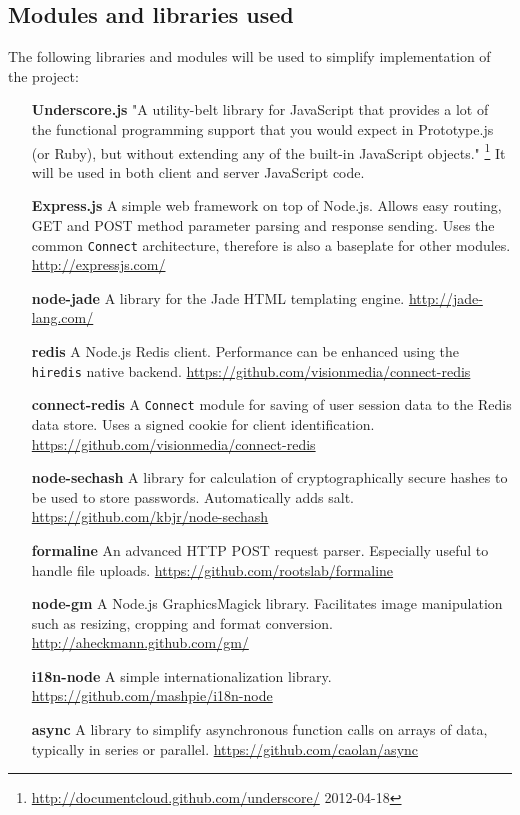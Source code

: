 \documentclass[12pt,oneside]{fithesis}
\begin{document}
	\subsection{Modules and libraries used}
		The following libraries and modules will be used to simplify implementation of the project:
		\begin{itemize}
			\item[\textbf{Underscore.js}] "A utility-belt library for JavaScript that provides a lot of the functional programming support that you would expect in Prototype.js (or Ruby), but without extending any of the built-in JavaScript objects." \footnote{\url{http://documentcloud.github.com/underscore/} 2012-04-18} It will be used in both client and server JavaScript code. 
			\item[\textbf{Express.js}] A simple web framework on top of Node.js. Allows easy routing, GET and POST method parameter parsing and response sending. Uses the common \texttt{Connect} architecture, therefore  is also a baseplate for other modules.  \url{http://expressjs.com/}
			\item[\textbf{node-jade}] A library for the Jade HTML templating engine. \url{http://jade-lang.com/}
			\item[\textbf{redis}] A Node.js Redis client. Performance can be enhanced using the \texttt{hiredis} native backend. \url{https://github.com/visionmedia/connect-redis}
			\item[\textbf{connect-redis}] A \texttt{Connect} module for saving of user session data to the Redis data store. Uses a signed cookie for client identification. \url{https://github.com/visionmedia/connect-redis}
			\item[\textbf{node-sechash}] A library for calculation of cryptographically secure hashes to be used to store passwords. Automatically adds salt. \url{https://github.com/kbjr/node-sechash}
			\item[\textbf{formaline}] An advanced HTTP POST request parser. Especially useful to handle file uploads. \url{https://github.com/rootslab/formaline}
			\item[\textbf{node-gm}] A Node.js GraphicsMagick library. Facilitates image manipulation such as resizing, cropping and format conversion. \url{http://aheckmann.github.com/gm/}
			\item[\textbf{i18n-node}] A simple internationalization library. \url{https://github.com/mashpie/i18n-node}
			\item[\textbf{async}] A library to simplify asynchronous function calls on arrays of data, typically in series or parallel. \url{https://github.com/caolan/async}

\end{itemize}
\end{document}
